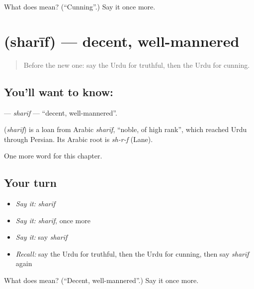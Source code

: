 \begin{tcolorbox}[breakable,colback=teal!4,colframe=teal!35!black,title={Before you move on}]
What does  mean? (\textquotedblleft{}Cunning\textquotedblright{}.) Say it once more.
\end{tcolorbox}
\section[\texorpdfstring{\ur{شریف} (sharīf)}{شریف (sharīf)}]{ (sharīf) — decent, well-mannered}

\label{lesson:UR-C223-sharif}



\begin{quote}
Before the new one: say the Urdu for truthful, then the Urdu for cunning.
\end{quote}

\subsection*{You'll want to know: }
\textbf{} — \emph{sharīf} — \textquotedblleft{}decent, well-mannered\textquotedblright{}.

\begin{cousinweb}
\textbf{} (\emph{sharīf}) is a loan from Arabic \emph{sharīf}, \textquotedblleft{}noble, of high rank\textquotedblright{}, which reached Urdu through Persian. Its Arabic root is \emph{sh-r-f} (Lane).
\end{cousinweb}

\begin{grammarlens}[title={What you've built}]
One more word for this chapter.
\end{grammarlens}

\subsection*{Your turn}
\begin{itemize}
\raggedright
  \item \emph{Say it:} \emph{sharīf}
  \item \emph{Say it:} \emph{sharīf}, once more
  \item \emph{Say it:} say \emph{sharīf}
  \item \emph{Recall:} say the Urdu for truthful, then the Urdu for cunning, then say \emph{sharīf} again
\end{itemize}

\begin{tcolorbox}[breakable,colback=teal!4,colframe=teal!35!black,title={Before you move on}]
What does  mean? (\textquotedblleft{}Decent, well-mannered\textquotedblright{}.) Say it once more.
\end{tcolorbox}
